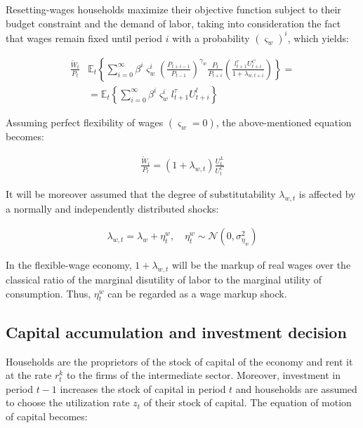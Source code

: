 \documentclass{pracamgr}
\numberwithin{equation}{section}
\begin{document}
Resetting-wages households maximize their objective function subject to their budget constraint and the demand of labor, taking into consideration the fact that wages remain fixed until period $i$ with a probability $\left( \varsigma_{w} \right)^{i}$, which yields:

\begin{align}
\frac{\widetilde{W}_{t}}{P_{t}} &\mathbb{E}_{t} \left\{ \sum\limits_{i=0}^{\infty} \beta^{i} \varsigma_{w}^{i} \left( \frac{P_{t+i-1}}{P_{t-1}} \right)^{\gamma_{w}}  \frac{P_{t}}{P_{t+i}} \left( \frac{l_{t+1}^{\tau} U_{t+i}^{C}}{1 + \lambda_{w, t+i}} \right) \right\} = \nonumber \\
&= \mathbb{E}_{t} 
\left\{ \sum\limits_{i=0}^{\infty} \beta^{i} \varsigma_{w}^{i} l_{t+1}^{\tau} U_{t+i}^{l} \right\}
\end{align}

Assuming perfect flexibility of wages $(\varsigma_{w} = 0)$, the above-mentioned equation becomes:

\begin{align}
\frac{\widetilde{W}_{t}}{P_{t}} = \left(1 + \lambda_{w, t} \right)\frac{U_{t}^{L}}{U_{t}^{C}}
\end{align}

It will be moreover assumed that the degree of substitutability $\lambda_{w, t}$ is affected by a normally and independently distributed shocks:

\begin{align}
\lambda_{w, t} = \lambda_{w} + \eta_{t}^{w}, \quad \eta_{t}^{w} \sim \mathcal{N} \left(0, \sigma^{2}_{\eta_{w}} \right)
\end{align}

In the flexible-wage economy, $1+\lambda_{w, t}$ will be the markup of real wages over the classical ratio of the marginal disutility of labor to the marginal utility of consumption. Thus, $\eta_{t}^{w}$ can be regarded as a wage markup shock.

\subsection{Capital accumulation and investment decision} \label{Capital accumulation and investment decision}

Households are the proprietors of the stock of capital of the economy and rent it at the rate $r_{t}^{k}$ to the firms of the intermediate sector. Moreover, investment in period $t-1$ increases the stock of capital in period $t$ and households are assumed to choose the utilization rate $z_{t}$ of their stock of capital. The equation of motion of capital becomes:
\end{document}
